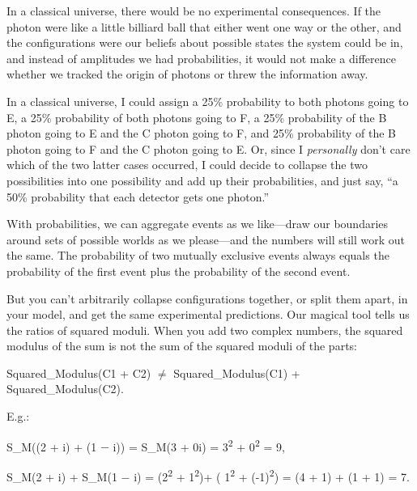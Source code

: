 {
 In a classical universe, there would be no experimental
consequences. If the photon were like a little billiard ball that
either went one way or the other, and the configurations were our
beliefs about possible states the system could be in, and instead of
amplitudes we had probabilities, it would not make a difference whether
we tracked the origin of photons or threw the information away.}

{
 In a classical universe, I could assign a 25\% probability to both
photons going to E, a 25\% probability of both photons going to F, a
25\% probability of the B photon going to E and the C photon going to
F, and 25\% probability of the B photon going to F and the C photon
going to E. Or, since I \textit{personally} don't care
which of the two latter cases occurred, I could decide to collapse the
two possibilities into one possibility and add up their probabilities,
and just say, ``a 50\% probability that each detector
gets one photon.''}

{
 With probabilities, we can aggregate events as we like---draw our
boundaries around sets of possible worlds as we please---and the
numbers will still work out the same. The probability of two mutually
exclusive events always equals the probability of the first event plus
the probability of the second event.}

{
 But you can't arbitrarily collapse configurations
together, or split them apart, in your model, and get the same
experimental predictions. Our magical tool tells us the ratios of
squared moduli. When you add two complex numbers, the squared modulus
of the sum is not the sum of the squared moduli of the parts:}

{\centering
 Squared\_Modulus(C1 + C2) ${\neq}$ Squared\_Modulus(C1) +
Squared\_Modulus(C2).
\par}


\bigskip

{
 E.g.:}

{\centering
 S\_M((2 + i) + (1 $-$ i)) = S\_M(3 + 0i)\newline
 = 3\textsuperscript{2} + 0\textsuperscript{2}\newline
 = 9,
\par}


\bigskip

{\centering
 S\_M(2 + i) + S\_M(1 $-$ i) = (2\textsuperscript{2} +
1\textsuperscript{2})+ ( 1\textsuperscript{2} +
(-1)\textsuperscript{2})\newline
 = (4 + 1) + (1 + 1)\newline
 = 7.
\par}


